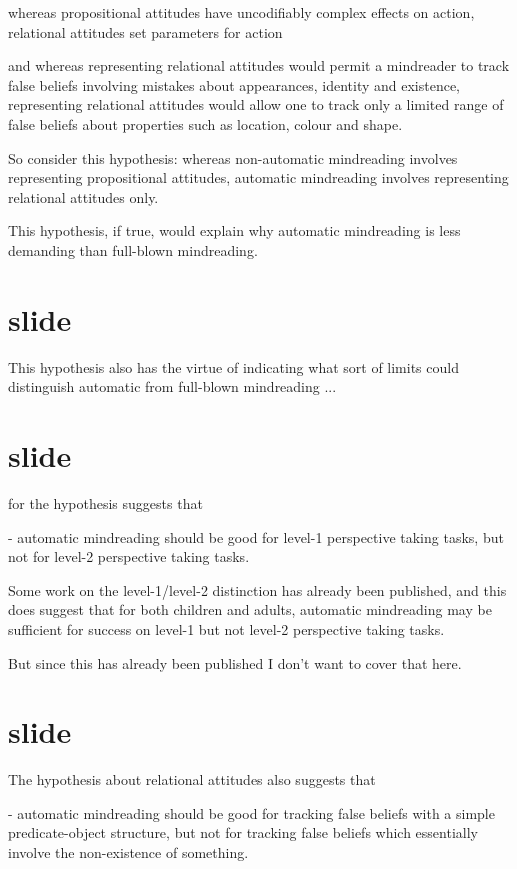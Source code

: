 \documentclass[14pt,\papersize]{extarticle}
\begin{document}
whereas propositional attitudes have uncodifiably complex effects on action, 
relational attitudes set parameters for action

and whereas representing relational attitudes would permit a mindreader to track false beliefs involving mistakes about 
   appearances,
   identity
 and 
    existence,
representing relational attitudes would allow one to track only a limited range of false beliefs about properties such as location, colour and shape.

So consider this hypothesis:
whereas non-automatic mindreading involves representing propositional attitudes,
automatic mindreading involves representing relational attitudes only.

This hypothesis, if true, would explain why automatic mindreading is less demanding than full-blown mindreading.


\section{slide}

This hypothesis also has the virtue of indicating what sort of limits could distinguish automatic from full-blown mindreading ...


\section{slide}
for the hypothesis suggests that 

- automatic mindreading should be good for level-1 perspective taking tasks,
but not for level-2 perspective taking tasks.


Some work on the level-1/level-2 distinction has already been published,
and this does suggest that for both children and adults,
automatic mindreading may be sufficient for success on level-1 but not level-2 perspective taking tasks.

But since this has already been published I don't want to cover that here.


\section{slide}

The hypothesis about relational attitudes also suggests that 

- automatic mindreading should be good for tracking false beliefs with a simple predicate-object structure, but not for tracking false beliefs which essentially involve the non-existence of something.
\end{document}
